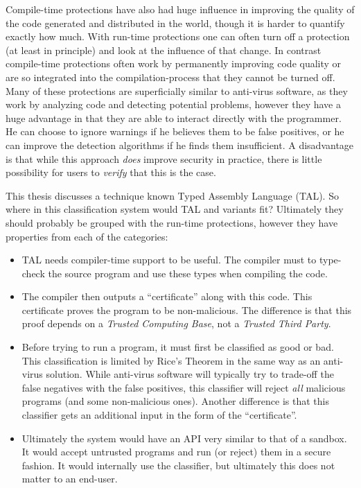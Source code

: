 Compile-time protections have also had huge influence in improving the quality
of the code generated and distributed in the world, though it is harder to
quantify exactly how much. With run-time protections one can often turn off a
protection (at least in principle) and look at the influence of that change. In
contrast compile-time protections often work by permanently improving code
quality or are so integrated into the compilation-process that they cannot be
turned off. Many of these protections are superficially similar to anti-virus
software, as they work by analyzing code and detecting potential problems,
however they have a huge advantage in that they are able to interact directly
with the programmer. He can choose to ignore warnings if he believes them to be
false positives, or he can improve the detection algorithms if he finds them
insufficient. A disadvantage is that while this approach \emph{does} improve
security in practice, there is little possibility for users to \emph{verify}
that this is the case.

This thesis discusses a technique known Typed Assembly Language (TAL). So where
in this classification system would TAL and variants fit? Ultimately they should
probably be grouped with the run-time protections, however they have properties
from each of the categories:

\begin{itemize}
\item TAL needs compiler-time support to be useful. The compiler must to
  type-check the source program and use these types when compiling the code.
\item The compiler then outputs a ``certificate'' along with this code. This
  certificate proves the program to be non-malicious. The difference is that
  this proof depends on a \emph{Trusted Computing Base}, not a \emph{Trusted
    Third Party}.
\item Before trying to run a program, it must first be classified as good or
  bad. This classification is limited by Rice's Theorem in the same way as an
  anti-virus solution. While anti-virus software will typically try to trade-off
  the false negatives with the false positives, this classifier will reject
  \emph{all} malicious programs (and some non-malicious ones). Another
  difference is that this classifier gets an additional input in the form of the
  ``certificate''.
\item Ultimately the system would have an API very similar to that of a
  sandbox. It would accept untrusted programs and run (or reject) them in a
  secure fashion. It would internally use the classifier, but ultimately this
  does not matter to an end-user.
\end{itemize}

